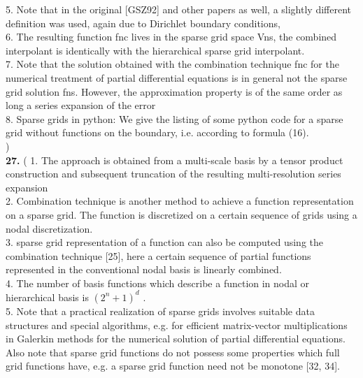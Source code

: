 5. Note that in the original [GSZ92] and other papers as well, a slightly different definition was used, again due to Dirichlet boundary conditions, \cite{Garcke2006a}\\

6. The resulting function fnc lives in the sparse grid space Vns, the combined interpolant is identically with the hierarchical sparse grid interpolant.\cite{Garcke2006a}\\

7. Note that the solution obtained with the combination technique fnc for the numerical treatment of partial differential equations is in general not the sparse grid solution fns. However, the approximation property is of the same order as long a series expansion of the error\cite{Garcke2006a}\\

8. Sparse grids in python: We give the listing of some python code for a sparse grid without functions on the boundary, i.e. according to formula (16).\cite{Garcke2006a}\\
)\\

\textbf{27.}
(
1. The approach is obtained from a multi-scale basis by a tensor product construction and subsequent truncation of the resulting multi-resolution series expansion\cite{Garcke2013}\\

2. Combination technique is another method to achieve a function representation on a sparse grid. The function is discretized on a certain sequence of grids using a nodal discretization.\cite{Garcke2013}\\

3. sparse grid representation of a function can also be computed using the combination technique [25], here a certain sequence of partial functions represented in the conventional nodal basis is linearly combined.\cite{Garcke2013}\\

4. The number of basis functions which describe a function in nodal or hierarchical basis is $(2^n+1)^d$ .\cite{Garcke2013}\\

5. Note that a practical realization of sparse grids involves suitable data structures and special algorithms, e.g. for efficient matrix-vector multiplications in Galerkin methods for the numerical solution of partial differential equations.  Also note that sparse grid functions do not possess some properties which full grid functions have, e.g. a sparse grid function need not be monotone [32, 34].\cite{Garcke2013}\\

